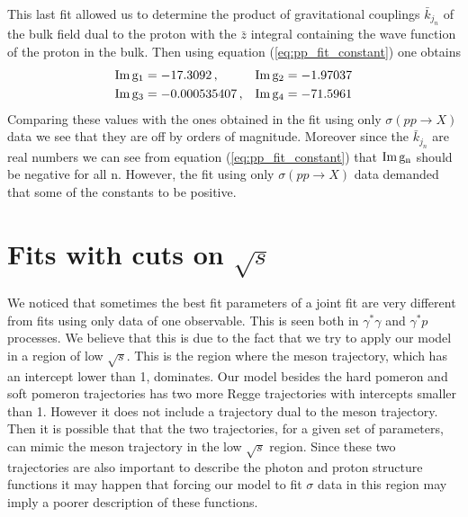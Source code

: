 \documentclass[preprint, 12pt]{elsarticle}
\begin{document}
This last fit allowed us to determine the product of gravitational couplings $\bar{k}_{j_n}$ of the bulk field dual to the proton with the $\bar{z}$ integral containing the wave function of the proton in the bulk. Then using equation (\ref{eq:pp_fit_constant}) one obtains
\begin{align}
& {\rm Im \, g_1} = -17.3092 \, , & {\rm Im \, g_2} = -1.97037 \notag \\
& {\rm Im \, g_3} = -0.000535407 \, , & {\rm Im \, g_4} =	-71.5961
\end{align}
Comparing these values with the ones obtained in the fit using only $\sigma\left(p p \rightarrow X\right)$ data we see that they are off by orders of magnitude. Moreover since the $\bar{k}_{j_n}$ are real numbers we can see from equation (\ref{eq:pp_fit_constant}) that ${\rm Im \, g_n}$ should be negative for all n. However, the fit using only $\sigma\left(p p \rightarrow X\right)$ data demanded that some of the constants to be positive.

\section{Fits with cuts on $\sqrt{s}$}

We noticed that  sometimes the best fit parameters of a joint fit are very different from fits using only data of one observable. This is seen both in $\gamma^{*} \gamma$ and $\gamma^{*} p$ processes. We believe that this is due to the fact that we try to apply our model in a region of low $\sqrt{s}$. This is the region where the meson trajectory, which has an intercept lower than 1, dominates. Our model besides the hard pomeron and soft pomeron trajectories has two more Regge trajectories with intercepts smaller than 1. However it does not include a trajectory dual to the meson trajectory. Then it is possible that that the two trajectories, for a given set of parameters, can mimic the meson trajectory in the low $\sqrt{s}$ region. Since these two trajectories are also important to describe the photon and proton structure functions it may happen that forcing our model to fit $\sigma$ data in this region may imply a poorer description of these functions. 
\end{document}

